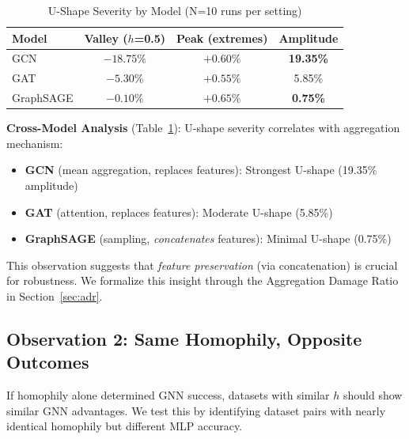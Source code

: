 \begin{table}[t]
\centering
\caption{U-Shape Severity by Model (N=10 runs per setting)}
\label{tab:ushape_severity}
\begin{tabular}{@{}lccc@{}}
\toprule
\textbf{Model} & \textbf{Valley ($h$=0.5)} & \textbf{Peak (extremes)} & \textbf{Amplitude} \\
\midrule
GCN & $-18.75\%$ & $+0.60\%$ & \textbf{19.35\%} \\
GAT & $-5.30\%$ & $+0.55\%$ & 5.85\% \\
GraphSAGE & $-0.10\%$ & $+0.65\%$ & \textbf{0.75\%} \\
\bottomrule
\end{tabular}
\end{table}

\textbf{Cross-Model Analysis} (Table~\ref{tab:ushape_severity}): U-shape severity correlates with aggregation mechanism:
\begin{itemize}
    \item \textbf{GCN} (mean aggregation, replaces features): Strongest U-shape (19.35\% amplitude)
    \item \textbf{GAT} (attention, replaces features): Moderate U-shape (5.85\%)
    \item \textbf{GraphSAGE} (sampling, \textit{concatenates} features): Minimal U-shape (0.75\%)
\end{itemize}

This observation suggests that \textit{feature preservation} (via concatenation) is crucial for robustness. We formalize this insight through the Aggregation Damage Ratio in Section~\ref{sec:adr}.

\subsection{Observation 2: Same Homophily, Opposite Outcomes}
\label{sec:same_h_obs}

If homophily alone determined GNN success, datasets with similar $h$ should show similar GNN advantages. We test this by identifying dataset pairs with nearly identical homophily but different MLP accuracy.

